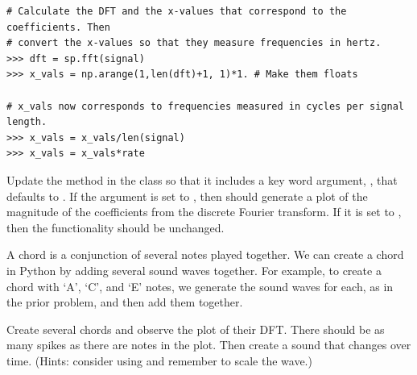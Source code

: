 \begin{lstlisting}
# Calculate the DFT and the x-values that correspond to the coefficients. Then
# convert the x-values so that they measure frequencies in hertz.
>>> dft = sp.fft(signal)
>>> x_vals = np.arange(1,len(dft)+1, 1)*1. # Make them floats

# x_vals now corresponds to frequencies measured in cycles per signal length.
>>> x_vals = x_vals/len(signal)
>>> x_vals = x_vals*rate
\end{lstlisting}

\begin{problem}
Update the  method in the  class so that it includes a key word argument, , that defaults to .
If the  argument is set to , then  should generate a plot of the magnitude of the coefficients from the discrete Fourier transform.
If it is set to , then the functionality should be unchanged.
\end{problem}

\begin{problem}
A chord is a conjunction of several notes played together.
We can create a chord in Python by adding several sound waves together.
For example, to create a chord with `A', `C', and `E' notes, we generate the sound waves for each, as in the prior problem, and then add them together.

Create several chords and observe the plot of their DFT.
There should be as many spikes as there are notes in the plot.
Then create a sound that changes over time.
(Hints: consider using  and remember to scale the wave.)
\end{problem}

